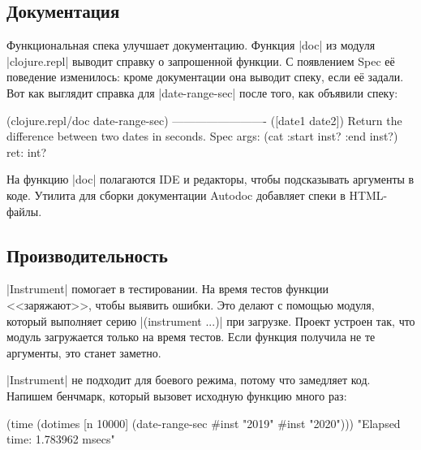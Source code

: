 \subsection{Документация}


Функциональная спека улучшает документацию. Функция \spverb|doc| из модуля
\spverb|clojure.repl| выводит справку о запрошенной функции. С появлением Spec
е\"{е} поведение изменилось: кроме документации она выводит спеку, если е\"{е}
задали. Вот как выглядит справка для \spverb|date-range-sec| после того, как
объявили спеку:

\begin{english}
  \begin{clojure}
(clojure.repl/doc date-range-sec)
-------------------------
([date1 date2])
  Return the difference between two dates in seconds.
Spec
  args: (cat :start inst? :end inst?)
  ret: int?
  \end{clojure}
\end{english}


На функцию \spverb|doc| полагаются IDE и редакторы, чтобы подсказывать аргументы
в коде. Утилита для сборки документации Autodoc
добавляет спеки в HTML-файлы.

\subsection{Производительность}


\spverb|Instrument| помогает в тестировании. На время тестов функции
<<заряжают>>, чтобы выявить ошибки. Это делают с помощью модуля, который
выполняет серию \spverb|(instrument ...)| при загрузке. Проект устроен так, что
модуль загружается только на время тестов. Если функция получила не те
аргументы, это станет заметно.


\spverb|Instrument| не подходит для боевого режима, потому что замедляет
код. Напишем бенчмарк, который вызовет исходную функцию много раз:


\begin{english}
  \begin{clojure}
(time
 (dotimes [n 10000]
   (date-range-sec #inst "2019" #inst "2020")))
"Elapsed time: 1.783962 msecs"
  \end{clojure}
\end{english}


